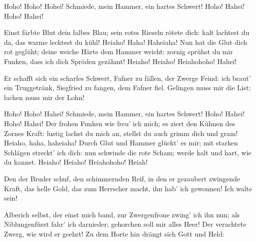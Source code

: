 \begin{drama}

Hoho! Hoho! Hohei!
Schmiede, mein Hammer,
ein hartes Schwert!
Hoho! Hahei!
Hoho! Hahei!

Einst färbte Blut
dein falbes Blau;
sein rotes Rieseln
rötete dich:
kalt lachtest du da,
das warme lecktest du kühl!
Heiaho! Haha!
Haheiaha!
Nun hat die Glut
dich rot geglüht;
deine weiche Härte
dem Hammer weicht:
zornig sprühst du mir Funken,
dass ich dich Spröden gezähmt!
Heiaho! Heiaho!
Heiahohoho!
Hahei!

\Mimespeaks


Er schafft sich ein scharfes Schwert,
Fafner zu fällen,
der Zwerge Feind:
ich braut' ein Truggetränk,
Siegfried zu fangen,
dem Fafner fiel.
Gelingen muss mir die List;
lachen muss mir der Lohn!


\Siegfriedspeaks

Hoho! Hoho!
Hahei!
Schmiede, mein Hammer,
ein hartes Schwert!
Hoho! Hahei!
Hoho! Hahei!
Der frohen Funken
wie freu' ich mich;
es ziert den Kühnen
des Zornes Kraft:
lustig lachst du mich an,
stellst du auch grimm dich und gram!
Heiaho, haha,
haheiaha!
Durch Glut und Hammer
glückt' es mir;
mit starken Schlägen
streckt' ich dich:
nun schwinde die rote Scham;
werde kalt und hart, wie du kannst.
Heiaho! Heiaho!
Heiahohoho!
Heiah!



\Mimespeaks

Den der Bruder schuf,
den schimmernden Reif,
in den er gezaubert
zwingende Kraft,
das helle Gold,
das zum Herrscher macht,
ihn hab' ich gewonnen!
Ich walte sein!


Alberich selbst,
der einst mich band,
zur Zwergenfrone
zwing' ich ihn nun;
als Niblungenfürst
fahr' ich darnieder;
gehorchen soll mir
alles Heer!
Der verachtete Zwerg,
wie wird er geehrt!
Zu dem Horte hin drängt sich
Gott und Held:


\end{drama}
